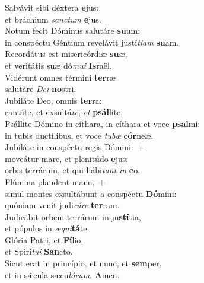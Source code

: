 \evenverse Salvávit sibi déxtera \textbf{e}jus:~\*\\
\evenverse et bráchium \textit{san}\textit{ctum} \textbf{e}jus.\\
\oddverse Notum fecit Dóminus salutáre \textbf{su}um:~\*\\
\oddverse in conspéctu Géntium revelávit justí\textit{ti}\textit{am} \textbf{su}am.\\
\evenverse Recordátus est misericórdiæ \textbf{su}æ,~\*\\
\evenverse et veritátis suæ dó\textit{mu}\textit{i} \textbf{Is}raël.\\
\oddverse Vidérunt omnes términi \textbf{ter}ræ~\*\\
\oddverse salutáre \textit{De}\textit{i} \textbf{no}stri.\\
\evenverse Jubiláte Deo, omnis \textbf{ter}ra:~\*\\
\evenverse cantáte, et exsultá\textit{te}, \textit{et} \textbf{psál}lite.\\
\oddverse Psállite Dómino in cíthara, in cíthara et voce \textbf{psal}mi:~\*\\
\oddverse in tubis ductílibus, et voce \textit{tu}\textit{bæ} \textbf{cór}neæ.\\
\evenverse Jubiláte in conspéctu regis Dómini:~+\\
\evenverse  moveátur mare, et plenitúdo \textbf{e}jus:~\*\\
\evenverse orbis terrárum, et qui hábi\textit{tant} \textit{in} \textbf{e}o.\\
\oddverse Flúmina plaudent manu,~+\\
\oddverse  simul montes exsultábunt a conspéctu \textbf{Dó}mini:~\*\\
\oddverse quóniam venit judi\textit{cá}\textit{re} \textbf{ter}ram.\\
\evenverse Judicábit orbem terrárum in ju\textbf{stí}tia,~\*\\
\evenverse et pópulos in \textit{æ}\textit{qui}\textbf{tá}te.\\
\oddverse Glória Patri, et \textbf{Fí}lio,~\*\\
\oddverse et Spirí\textit{tu}\textit{i} \textbf{San}cto.\\
\evenverse Sicut erat in princípio, et nunc, et \textbf{sem}per,~\*\\
\evenverse et in sǽcula sæcu\textit{ló}\textit{rum}. \textbf{A}men.\\
